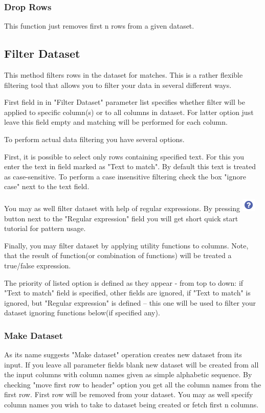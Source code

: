 \documentclass[USenglish]{article}
\begin{document}
\subsubsection{Drop Rows}
This function just removes first n rows from a given dataset.
\subsection{Filter Dataset}
This method filters rows in the dataset for matches. This is a rather flexible filtering tool that allows you to filter your data in several different ways.

First field in in "Filter Dataset" parameter list specifies whether filter will be applied to specific column(s) or to all columns in dataset. For latter option just leave this field empty and matching will be performed for each column.

To perform actual data filtering you have several options.

First, it is possible to select only rows containing specified text. For this you enter the text in field marked as "Text to match". By default this text is treated as case-sensitive. To perform a case insensitive filtering check the box "ignore case" next to the text field.

You may as well filter dataset with help of regular expressions. By pressing {\includegraphics[scale=0.6]{tutorial.png}} button next to the "Regular expression" field  you will get short quick start tutorial for pattern usage.

Finally, you may filter dataset by applying utility functions to columns. Note, that the result of function(or combination of functions) will be treated a true/false expression.

The priority of listed option is defined as they appear - from top to down: if "Text to match" field is specified, other fields are ignored, if "Text to match" is ignored, but "Regular expression" is defined -- this one will be used to filter your dataset ignoring functions below(if specified any).
\subsubsection{Make Dataset}
As its name suggests "Make dataset" operation creates new dataset from its input. If you leave all parameter fields blank new dataset will be created from all the input columns with column names given as simple alphabetic sequence. By checking "move first row to header" option you get all the column names from the first row. First row will be removed from your dataset. You may as well specify column names you wish to take to dataset being created or fetch first n columns.
\end{document}
